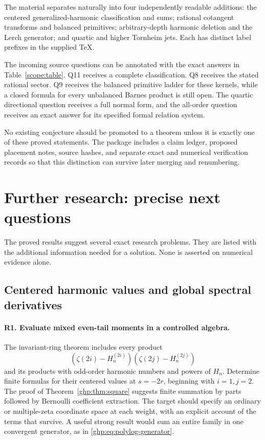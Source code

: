 \documentclass[11pt,a4paper]{article}
\numberwithin{equation}{section}
\theoremstyle{definition}
\theoremstyle{remark}
\begin{document}
The material separates naturally into four independently
readable additions: the centered generalized-harmonic
classification and sums; rational cotangent transforms and
balanced primitives; arbitrary-depth harmonic deletion and
the Lerch generator; and quartic and higher Tornheim jets.
Each has distinct label prefixes in the supplied TeX.

The incoming source questions can be annotated with the exact
answers in Table~\ref{scope:table}. Q11 receives a complete
classification. Q8 receives the stated rational sector.
Q9 receives the balanced primitive ladder for these kernels,
while a closed formula for every unbalanced Barnes product
is still open. The quartic directional question receives a
full normal form, and the all-order question receives an
exact answer for its specified formal relation system.

No existing conjecture should be promoted to a theorem
unless it is exactly one of these proved statements.
The package includes a claim ledger, proposed placement
notes, source hashes, and separate exact and numerical
verification records so that this distinction can survive
later merging and renumbering.



\section{Further research: precise next questions}
\label{research:section}

The proved results suggest several exact research problems.
They are listed with the additional information needed for
a solution. None is asserted on numerical evidence alone.

\subsection{Centered harmonic values and global spectral derivatives}

\paragraph{R1. Evaluate mixed even-tail moments in a controlled algebra.}
The invariant-ring theorem includes every product
\[
 (\zeta(2i)-H_n^{(2i)})(\zeta(2j)-H_n^{(2j)})
\]
and its products with odd-order harmonic numbers and powers
of $H_n$. Determine finite formulas for their centered
values at $s=-2r$, beginning with $i=1,j=2$.
The proof of Theorem~\ref{ghp:thm:square} suggests finite
summation by parts followed by Bernoulli coefficient
extraction. The target should specify an ordinary or
multiple-zeta coordinate space at each weight, with an
explicit account of the terms that survive. A useful
strong result would sum an entire family in one convergent
generator, as in \eqref{ghp:eq:polylog-generator}.
\end{document}
